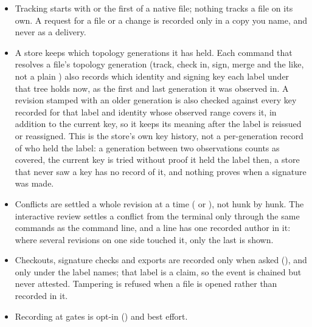 \begin{itemize}
  \item Tracking starts with  or the first 
  of a native file; nothing tracks a file on its own. A request for a file
  or a change is recorded only in a copy you name, and never as a delivery.
  \item A store keeps which topology generations it has held. Each command that
  resolves a file's topology generation (track, check in, sign, merge and
  the like, not a plain ) also records which identity and
  signing key each label under that tree holds now, as the first and last
  generation it was observed in. A revision stamped with an older
  generation is also checked against every key recorded for that label and
  identity whose observed range covers it, in addition to the current key,
  so it keeps its meaning after the label is reissued or reassigned. This is
  the store's own key history, not a per-generation record of who held the
  label: a generation between two observations counts as covered, the
  current key is tried without proof it held the label then, a store that
  never saw a key has no record of it, and nothing proves when a signature
  was made.
  \item Conflicts are settled a whole revision at a time ( or
  ), not hunk by hunk. The interactive review settles a conflict
  from the terminal only through the same commands as the command line, and
  a line has one recorded author in it: where several revisions on one side
  touched it, only the last is shown.
  \item Checkouts, signature checks and exports are recorded only when asked
  (), and only under the label  names; that label is
  a claim, so the event is chained but never attested. Tampering is refused
  when a file is opened rather than recorded in it.
  \item Recording at gates is opt-in () and best effort.
\end{itemize}
